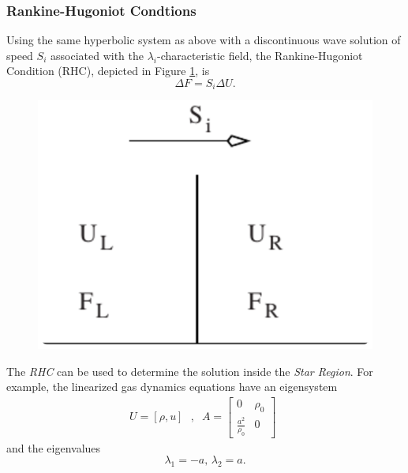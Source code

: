 \documentclass[]{article}
\begin{document}
		\subsubsection{Rankine-Hugoniot Condtions}
			Using the same hyperbolic system as above with a discontinuous wave solution of speed $ S_i $ associated with the $ \lambda_i $-characteristic field, the Rankine-Hugoniot Condition (RHC), depicted in Figure \ref{RankineHugoniot}, is
			\begin{equation}
				\Delta F = S_i \Delta U.
			\end{equation}		
			\begin{figure}[h] 	
				\centering
				\includegraphics[scale=.55]{RankineHugoniot}
				\caption{}
				\label{RankineHugoniot}
			\end{figure}
			The \textit{RHC} can be used to determine the solution inside the \textit{Star Region}. For example, the linearized gas dynamics equations have an eigensystem
			\begin{equation}	
				U = [\rho, u] \mbox{ } \mbox{, }		
				\begin{aligned}
				A =\left[
					\begin{array}{ll}
						 0 & \rho_0\\
						\frac{a^2}{\rho_0} & 0 
					\end{array}
				\right]
				\end{aligned}
			\end{equation}
			and the eigenvalues
			\begin{equation}
				\lambda_1 = -a \mbox{, } \lambda_2 = a.
			\end{equation}
\end{document}
